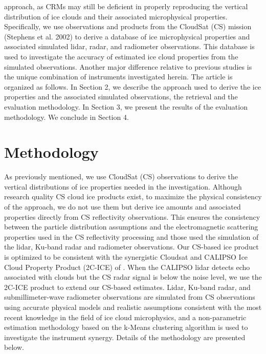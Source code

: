 \documentclass{ametsocV6.1}
\begin{document}
approach, as CRMs may still be deficient in properly reproducing the vertical distribution of ice 
clouds and their associated microphysical properties.  Specifically, we use observations and
products from the CloudSat (CS) mission (Stephens et al. 2002) to derive a database of ice microphysical
properties and associated simulated lidar, radar, and radiometer observations.  This database is used to
investigate the accuracy of estimated ice cloud properties from the simulated observations. Another major
difference relative to previous studies is the unique combination of instruments investigated herein.
The article is organized as follows.  In Section 2, we describe the approach used to derive the ice properties and
the associated simulated observations, the retrieval and the evaluation methodology.  In Section 3, we 
present the results of the evaluation methodology. We conclude in Section 4.

\section{Methodology}
As previously mentioned, we use CloudSat (CS) observations \citep{stephens2002} to derive the vertical 
distributions of ice properties needed in the investigation.  Although research quality CS cloud ice 
products exist, to maximize the physical consistency of the approach, we do not use them but derive ice amounts
and associated properties directly from CS reflectivity observations.  This ensures the consistency between 
the particle
distribution assumptions and the electromagnetic scattering properties used in the CS reflectivity processing 
and those used the simulation of the lidar, Ku-band radar and radiometer observations.  
Our CS-based ice product is optimized to be consistent with the synergistic 
Cloudsat and CALIPSO Ice Cloud Property Product (2C-ICE) of \cite{deng2015}.  When the CALIPSO lidar detects echo
associated with clouds but the CS radar signal is below the noise level, we use the 2C-ICE product to extend our 
CS-based estimates. Lidar, Ku-band radar, and submillimeter-wave radiometer observations are simulated 
from CS observations using accurate physical 
models and realistic assumptions consistent with the most recent knowledge in the field of ice cloud 
microphysics, and a non-parametric estimation methodology based on the k-Means clustering algorithm 
\cite{mackay2003information} is used to 
investigate the instrument synergy.  Details of the methodology are presented below.
\end{document}
